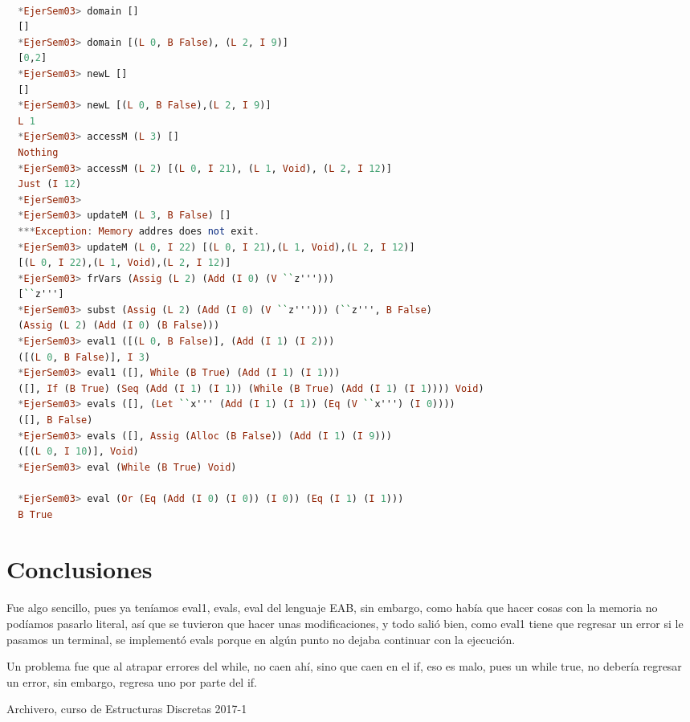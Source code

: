 \documentclass[spanish,12pt,letterpaper]{article}
\begin{document}
\begin{lstlisting}[language=Haskell]

  *EjerSem03> domain []
  []
  *EjerSem03> domain [(L 0, B False), (L 2, I 9)]
  [0,2]
  *EjerSem03> newL []
  []
  *EjerSem03> newL [(L 0, B False),(L 2, I 9)]
  L 1
  *EjerSem03> accessM (L 3) []
  Nothing
  *EjerSem03> accessM (L 2) [(L 0, I 21), (L 1, Void), (L 2, I 12)]
  Just (I 12)
  *EjerSem03>  
  *EjerSem03> updateM (L 3, B False) []
  ***Exception: Memory addres does not exit.
  *EjerSem03> updateM (L 0, I 22) [(L 0, I 21),(L 1, Void),(L 2, I 12)]
  [(L 0, I 22),(L 1, Void),(L 2, I 12)]
  *EjerSem03> frVars (Assig (L 2) (Add (I 0) (V ``z''')))
  [``z''']
  *EjerSem03> subst (Assig (L 2) (Add (I 0) (V ``z'''))) (``z''', B False)
  (Assig (L 2) (Add (I 0) (B False)))
  *EjerSem03> eval1 ([(L 0, B False)], (Add (I 1) (I 2)))
  ([(L 0, B False)], I 3)
  *EjerSem03> eval1 ([], While (B True) (Add (I 1) (I 1)))
  ([], If (B True) (Seq (Add (I 1) (I 1)) (While (B True) (Add (I 1) (I 1)))) Void)
  *EjerSem03> evals ([], (Let ``x''' (Add (I 1) (I 1)) (Eq (V ``x''') (I 0))))
  ([], B False)
  *EjerSem03> evals ([], Assig (Alloc (B False)) (Add (I 1) (I 9)))
  ([(L 0, I 10)], Void)
  *EjerSem03> eval (While (B True) Void)

  *EjerSem03> eval (Or (Eq (Add (I 0) (I 0)) (I 0)) (Eq (I 1) (I 1)))
  B True

\end{lstlisting}

\section{Conclusiones}

Fue algo sencillo, pues ya teníamos eval1, evals, eval del lenguaje EAB, sin
embargo, como había que hacer cosas con la memoria no podíamos pasarlo literal,
así que se tuvieron que hacer unas modificaciones, y todo salió bien, como eval1
tiene que regresar un error si le pasamos un terminal, se implementó evals
porque en algún punto no dejaba continuar con la ejecución.

Un problema fue que al atrapar errores del while, no caen ahí, sino que caen en
el if, eso es malo, pues un while true, no debería regresar un error, sin
embargo, regresa uno por parte del if.


\begin{thebibliography}{9}

  Archivero, curso de Estructuras Discretas 2017-1
\end{thebibliography}
\end{document}
